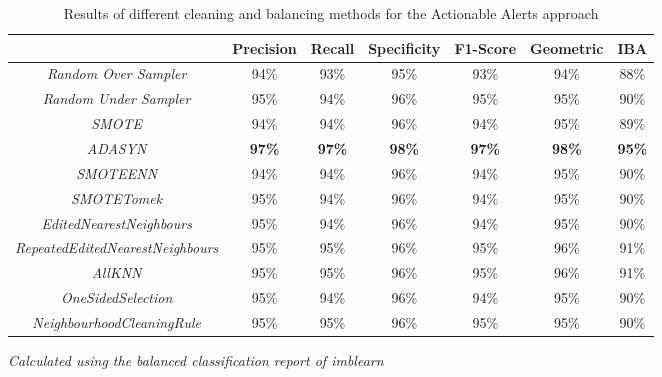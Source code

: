 \begin{table}[H]
	\caption{Results of different cleaning and balancing methods for the Actionable Alerts approach}
	\label{result:actalerts}
	\centering
	\begin{tabular}{@{}ccccccc@{}}
		\toprule
		& \textbf{Precision} & \textbf{Recall} & \textbf{Specificity} & \textbf{F1-Score} & \textbf{Geometric} & \textbf{IBA}  \\ \midrule
		\textit{Random Over Sampler}             & 94\%               & 93\%            & 95\%                 & 93\%              & 94\%               & 88\%          \\
		\textit{Random Under Sampler}            & 95\%               & 94\%            & 96\%                 & 95\%              & 95\%               & 90\%          \\
		\textit{SMOTE}                           & 94\%               & 94\%            & 96\%                 & 94\%              & 95\%               & 89\%          \\
		\textit{ADASYN}                          & \textbf{97\%}      & \textbf{97\%}   & \textbf{98\%}        & \textbf{97\%}     & \textbf{98\%}      & \textbf{95\%} \\
		\textit{SMOTEENN}                        & 94\%               & 94\%            & 96\%                 & 94\%              & 95\%               & 90\%          \\
		\textit{SMOTETomek}                      & 95\%               & 94\%            & 96\%                 & 94\%              & 95\%               & 90\%          \\
		\textit{EditedNearestNeighbours}         & 95\%               & 94\%            & 96\%                 & 94\%              & 95\%               & 90\%          \\
		\textit{RepeatedEditedNearestNeighbours} & 95\%               & 95\%            & 96\%                 & 95\%              & 96\%               & 91\%          \\
		\textit{AllKNN}                          & 95\%               & 95\%            & 96\%                 & 95\%              & 96\%               & 91\%          \\
		\textit{OneSidedSelection}               & 95\%               & 94\%            & 96\%                 & 94\%              & 95\%               & 90\%          \\
		\textit{NeighbourhoodCleaningRule}       & 95\%               & 95\%            & 96\%                 & 95\%              & 95\%               & 90\%          \\ \bottomrule
	\end{tabular}
	\textit{Calculated using the balanced classification report of \textit{imblearn} \cite{imblearn}}
\end{table}


